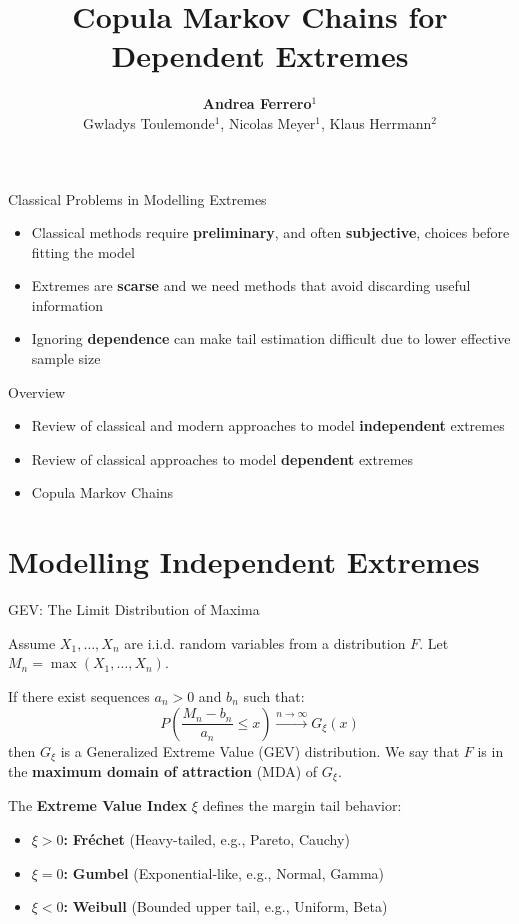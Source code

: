 \documentclass[10pt, aspectratio=169]{beamer}
\title{Copula Markov Chains for Dependent Extremes}
\author{
  \textbf{Andrea Ferrero}$^{1}$\\[0.2cm]
  \small Gwladys Toulemonde$^{1}$, Nicolas Meyer$^{1}$, Klaus Herrmann$^{2}$
}
\institute{
  $^{1}$ \textit{University of Montpellier, Lemon Team Inria} \\
  $^{2}$ \textit{University of Sherbrooke}
}
\date{}
\begin{document}
\maketitle

\begin{frame}{Classical Problems in Modelling Extremes}
    \begin{itemize}
        \item Classical methods require \textbf{preliminary}, and often \textbf{subjective}, choices before fitting the model
        \item Extremes are \textbf{scarse} and we need methods that avoid discarding useful information
        \item Ignoring \textbf{dependence} can make tail estimation difficult due to lower effective sample size
    \end{itemize}
\end{frame}

\begin{frame}{Overview}
    \begin{itemize}
        \item Review of classical and modern approaches to model \textbf{independent} extremes 
        \item Review of classical approaches to model \textbf{dependent} extremes
        \item Copula Markov Chains
    \end{itemize}
\end{frame}

\section{Modelling Independent Extremes}

\begin{frame}{GEV: The Limit Distribution of Maxima}

  Assume $X_1, \dots, X_n$ are \alert{i.i.d.} random variables from a distribution $F$. Let $M_n = \max(X_1, \dots, X_n)$. \pause
  
	If there exist sequences $a_n > 0$ and $b_n$ such that:
	\[
	P\left( \frac{M_n - b_n}{a_n} \le x \right) \xrightarrow{n \to \infty} G_\xi(x)
	\]
	then $G_\xi$ is a \alert{Generalized Extreme Value (GEV)} distribution. We say that $F$ is in the \textbf{maximum domain of attraction} (MDA) of $G_\xi$. \pause

  The \textbf{Extreme Value Index} $\xi$ defines the margin tail behavior:
  
  \begin{itemize}
    \item \textbf{$\xi > 0$:} \textbf{Fréchet} (Heavy-tailed, e.g., Pareto, Cauchy)
    \item \textbf{$\xi = 0$:} \textbf{Gumbel} (Exponential-like, e.g., Normal, Gamma)
    \item \textbf{$\xi < 0$:} \textbf{Weibull} (Bounded upper tail, e.g., Uniform, Beta)
  \end{itemize}
  
\end{frame}
\end{document}
